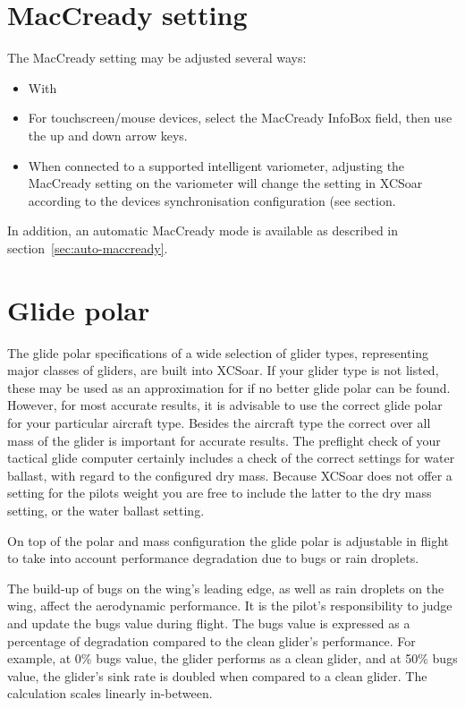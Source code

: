 \section{MacCready setting}

The MacCready setting may be adjusted several ways:
\begin{itemize}
\item With \blink{}
\item For touchscreen/mouse devices, select the MacCready InfoBox field, then
  use the up and down arrow keys.
\item When connected to a supported intelligent variometer, adjusting
  the MacCready setting on the variometer will change the setting
  in XCSoar according to the devices synchronisation configuration (see 
  section.
\end{itemize}
In addition, an automatic MacCready mode is available as described in
section~\ref{sec:auto-maccready}.


\section{Glide polar}

The glide polar specifications of a wide selection of glider types,
representing major classes of gliders, are built into XCSoar.
If your glider type is not listed, these may be used as an approximation for  
if no better glide polar can be found.   However, for most 
accurate results, it is advisable to use the correct glide polar for your particular
aircraft type. 
Besides the aircraft type the correct over all mass of the glider is important for 
accurate results. 
The preflight check of your tactical glide computer certainly 
includes a check of the correct settings for water ballast, with regard to the 
configured dry mass. Because XCSoar does not offer a setting for the pilots 
weight you are free to include the latter to the dry mass setting, or the 
water ballast setting.

On top of the polar and mass configuration the glide polar is adjustable 
in flight to take into account performance degradation due to bugs or 
rain droplets.

The build-up of bugs on the wing's leading edge, as well as rain
droplets on the wing, affect the aerodynamic performance.  It is the
pilot's responsibility to judge and update the bugs value during
flight.  The bugs value is expressed as a percentage of degradation 
compared to the clean glider's performance.  
For example, at 0\% bugs value, the glider
performs as a clean glider, and at 50\% bugs value, the glider's
sink rate is doubled when compared to a clean glider. The calculation 
scales linearly in-between. 

